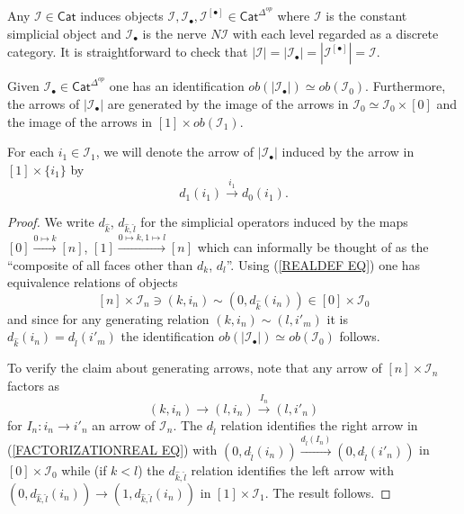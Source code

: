 \documentclass[a4paper,10pt]{article}%
\begin{document}
\begin{example}
  Any $\mathcal{I} \in \mathsf{Cat}$ induces objects 
  $\mathcal{I},\mathcal{I}_{\bullet},\mathcal{I}^{[\bullet]} \in \mathsf{Cat}^{\Delta^{op}}$ 
  where $\mathcal{I}$ is the constant simplicial object and $\mathcal{I}_{\bullet}$ is the nerve $N \mathcal{I}$ with each level regarded as a discrete category.
  It is straightforward to check that 
  $|\mathcal{I}|=|\mathcal{I}_{\bullet}| =
  |\mathcal{I}^{[\bullet]}| = \mathcal{I}$.
\end{example}


\begin{lemma}\label{OBJGENREL LEMMA}
  Given $\mathcal{I}_{\bullet} \in \mathsf{Cat}^{\Delta^{op}}$ one has an identification
  $ob(|\mathcal{I}_{\bullet}|) \simeq ob(\mathcal{I}_0)$.
  Furthermore, the arrows of $|\mathcal{I}_{\bullet}|$ are generated by the image of the arrows in $\mathcal{I}_0 \simeq \mathcal{I}_0 \times [0]$ and the image of the arrows in 
  $[1] \times ob(\mathcal{I}_1)$.
\end{lemma}

For each $i_1 \in \mathcal{I}_1$, we will denote the arrow of 
$|\mathcal{I}_{\bullet}|$ induced by the arrow in $[1] \times \{i_1\}$ by
\[d_1(i_1) \xrightarrow{i_1} d_0(i_1).\]


\begin{proof}
  We write $d_{\hat{k}}$, $d_{\hat{k},\hat{l}}$ for the simplicial operators induced by the maps 
  $[0]\xrightarrow{0 \mapsto k} [n]$,
  $[1]\xrightarrow{0 \mapsto k,1 \mapsto l} [n]$
  which can informally be thought of as the ``composite of all faces other than $d_k$, $d_l$''.
  Using (\ref{REALDEF EQ}) one has equivalence relations of objects  
  \[ [n] \times \mathcal{I}_n \ni (k,i_n) \sim (0,d_{\hat{k}}(i_n))
  \in [0] \times \mathcal{I}_0 \]
  and since for any generating relation $(k,i_n)\sim (l,i'_m)$
  it is $d_{\hat{k}}(i_n) = d_{\hat{l}}(i'_m)$ the identification 
  $ob(|\mathcal{I}_{\bullet}|) \simeq ob(\mathcal{I}_0)$
  follows.


  To verify the claim about generating arrows, note that any arrow of $[n]\times \mathcal{I}_n$ factors as 
  \begin{equation}\label{FACTORIZATIONREAL EQ}
    (k,i_n) \to (l,i_n)  \xrightarrow{I_n} (l,i'_n)
  \end{equation}
  for $I_n \colon i_n \to i'_n$
  an arrow of $\mathcal{I}_n$. 
  The $d_{\hat{l}}$ relation identifies the right arrow in 
  (\ref{FACTORIZATIONREAL EQ})
  with
  $(0,d_{\hat{l}}(i_n))
  \xrightarrow{d_{\hat{l}}(I_n)}
  (0,d_{\hat{l}}(i'_n))
  $
  in $[0]\times \mathcal{I}_0$
  while (if $k<l$) the $d_{\hat{k},\hat{l}}$ relation identifies the left arrow with 
  $(0,d_{\hat{k},\hat{l}}(i_n)) \to (1,d_{\hat{k},\hat{l}}(i_n))$
  in $[1]\times \mathcal{I}_1$. The result follows.
\end{proof}
\end{document}
